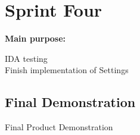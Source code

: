 \section{Sprint Four}
\begin{frame}
\textbf{Main purpose:}\\
\begin{center}
IDA testing\\
\pause
{ Finish implementation of Settings}\\
\end{center}
\end{frame}

\subsection{Final Demonstration}
\begin{frame}
\begin{center}
Final Product Demonstration
\end{center}
\end{frame}